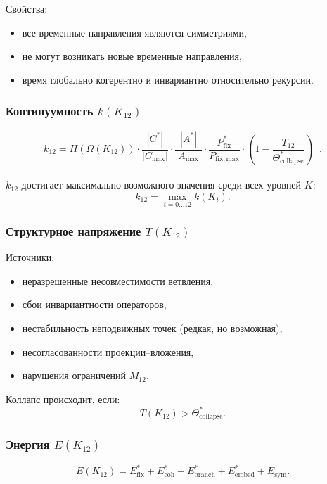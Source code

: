 Свойства:
\begin{itemize}
    \item все временные направления являются симметриями,
    \item не могут возникать новые временные направления,
    \item время глобально когерентно и инвариантно относительно рекурсии.
\end{itemize}

\subsubsection{Континуумность $k(K_{12})$}

\[
k_{12} =
H(\Omega(K_{12}))
\cdot
\frac{|C^*|}{|C_{\max}|}
\cdot
\frac{|A^*|}{|A_{\max}|}
\cdot
\frac{P_{\mathrm{fix}}^*}{P_{\mathrm{fix,max}}}
\cdot
\left(1-\frac{T_{12}}{\Theta^*_{\mathrm{collapse}}}\right)_+.
\]

$k_{12}$ достигает максимально возможного значения среди всех уровней $K$:
\[
k_{12} = \max_{i=0\dots12} k(K_i).
\]

\subsubsection{Структурное напряжение $T(K_{12})$}

Источники:
\begin{itemize}
    \item неразрешенные несовместимости ветвления,
    \item сбои инвариантности операторов,
    \item нестабильность неподвижных точек (редкая, но возможная),
    \item несогласованности проекции–вложения,
    \item нарушения ограничений $M_{12}$.
\end{itemize}

Коллапс происходит, если:
\[
T(K_{12}) > \Theta^*_{\mathrm{collapse}}.
\]

\subsubsection{Энергия $E(K_{12})$}

\[
E(K_{12}) =
E_{\mathrm{fix}}^*
+E_{\mathrm{coh}}^*
+E_{\mathrm{branch}}^*
+E_{\mathrm{embed}}^*
+E_{\mathrm{sym}}.
\]

